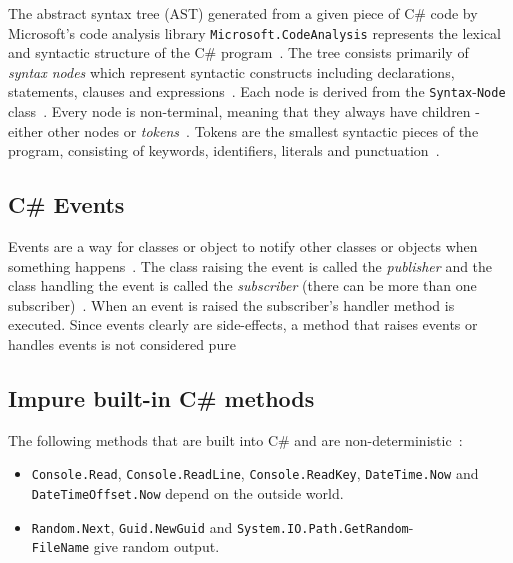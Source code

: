 \documentclass[a4paper,12pt]{article}
\begin{document}
The abstract syntax tree (AST) generated from a given piece of C\# code by Microsoft's code analysis library \texttt{Microsoft.CodeAnalysis} represents the lexical and syntactic structure of the C\# program~\cite{microsoft-work-with-syntax}. The tree consists primarily of \textit{syntax nodes} which represent syntactic constructs including declarations, statements, clauses and expressions~\cite{microsoft-work-with-syntax}. Each node is derived from the \texttt{Syntax}-\texttt{Node} class~\cite{microsoft-work-with-syntax}. Every node is non-terminal, meaning that they always have children - either other nodes or \textit{tokens}~\cite{microsoft-work-with-syntax}. Tokens are the smallest syntactic pieces of the program, consisting of keywords, identifiers, literals and punctuation~\cite{microsoft-work-with-syntax}.


\subsection{C\# Events} \label{sub:Events}

Events are a way for classes or object to notify other classes or objects when something happens~\cite{microsoft-events}. The class raising the event is called the \textit{publisher} and the class handling the event is called the \textit{subscriber} (there can be more than one subscriber)~\cite{microsoft-events}. When an event is raised the subscriber's handler method is executed. Since events clearly are side-effects, a method that raises events or handles events is not considered pure

\subsection{Impure built-in C\# methods} \label{sub:Impure-built-in-methods}

The following methods that are built into C\# and are non-deterministic~\cite{dixin2015}:

\begin{itemize}
  \item \texttt{Console.Read}, \texttt{Console.ReadLine}, \texttt{Console.ReadKey}, \texttt{DateTime\allowbreak.Now} and \texttt{DateTimeOffset.Now} depend on the outside world.
\item \texttt{Random.Next}, \texttt{Guid.NewGuid} and \texttt{System.IO.Path.GetRandom}-\\\texttt{\allowbreak FileName} give random output.
\end{itemize}
\end{document}
